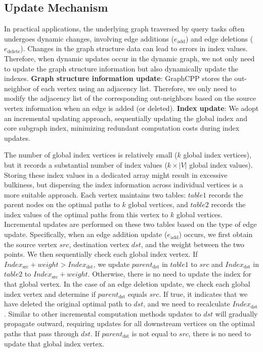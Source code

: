 \documentclass[lettersize,journal]{IEEEtran} %
\begin{document}
\subsection{Update Mechanism}
In practical applications, the underlying graph traversed by query tasks often undergoes dynamic changes, involving edge additions ($e_{\text{add}}$) and edge deletions ($e_{\text{delete}}$). Changes in the graph structure data can lead to errors in index values. Therefore, when dynamic updates occur in the dynamic graph, we not only need to update the graph structure information but also dynamically update the indexes. {\bf{Graph structure information update}}: GraphCPP stores the out-neighbor of each vertex using an adjacency list. Therefore, we only need to modify the adjacency list of the corresponding out-neighbors based on the source vertex information when an edge is added (or deleted). {\bf{Index update}}: We adopt an incremental updating approach, sequentially updating the global index and core subgraph index, minimizing redundant computation costs during index updates.

The number of global index vertices is relatively small ($k$ global index vertices), but it records a substantial number of index values ($k \times |V|$ global index values). Storing these index values in a dedicated array might result in excessive bulkiness, but dispersing the index information across individual vertices is a more suitable approach. Each vertex maintains two tables: $table1$ records the parent nodes on the optimal paths to $k$ global vertices, and $table2$ records the index values of the optimal paths from this vertex to $k$ global vertices. Incremental updates are performed on these two tables based on the type of edge update. Specifically, when an edge addition update ($e_{\text{add}}$) occurs, we first obtain the source vertex $src$, destination vertex $dst$, and the weight between the two points. We then sequentially check each global index vertex. If $Index_{\text{src}} + weight > Index_{\text{dst}}$, we update $parent_{\text{dst}}$ in $table1$ to $src$ and $Index_{\text{dst}}$ in $table2$ to $Index_{\text{src}} + weight$. Otherwise, there is no need to update the index for that global vertex. In the case of an edge deletion update, we check each global index vertex and determine if $parent_{\text{dst}}$ equals $src$. If true, it indicates that we have deleted the original optimal path to $dst$, and we need to recalculate $Index_{\text{dst}}$. Similar to other incremental computation methods\cite{kickstarter}\cite{graphbolt} updates to $dst$ will gradually propagate outward, requiring updates for all downstream vertices on the optimal paths that pass through $dst$. If $parent_{\text{dst}}$ is not equal to $src$, there is no need to update that global index vertex.
\end{document}

